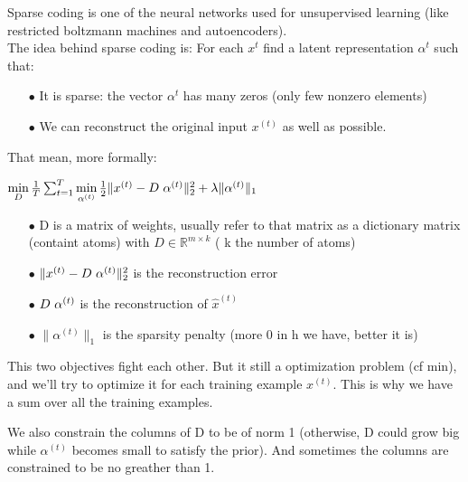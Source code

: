 \documentclass[a4paper,10pt]{article}
\newcommand{\R}{\mathbb{R}}
\begin{document}
Sparse coding is one of the neural networks used for unsupervised learning  (like restricted boltzmann machines and autoencoders).\\
The idea behind sparse coding is: For each $x^{t}$ find a latent representation $\alpha^{t}$ such that:
\begin{itemize}
 \item[$\bullet$] It is sparse: the vector $\alpha^{t}$ has many zeros (only few nonzero elements)
 \item[$\bullet$] We can reconstruct the original input $x^{(t)}$ as well as possible.
\end{itemize}
That mean, more formally:\\

\begin{center}
 $\min\limits_{D} \frac{1}{T} \sum_{t=1}^{T}  \min\limits_{\alpha^{(t)}} \frac{1}{2} \| x^{(t)} - D \hspace{3px} \alpha^{(t)} \|_2^2 + \lambda \|\alpha^{(t)} \|_1$\\
\end{center}

 \begin{itemize}
 \item[$\bullet$] D is a matrix of weights, usually refer to that matrix as a dictionary matrix (containt atoms) with $D \in  \R^{m \times k}$ ( k the number of atoms)
  \item[$\bullet$] $\| x^{(t)} - D \hspace{3px} \alpha^{(t)} \|_2^2 $ is the reconstruction error
  \item[$\bullet$]$ D \hspace{3px} \alpha^{(t)}$ is the reconstruction of $\hat{x}^{(t)}$
  \item[$\bullet$]$\|\alpha^{(t)} \|_1$ is the sparsity penalty (more 0 in h we have, better it is)
 \end{itemize}
This two objectives fight each other. But it still a optimization problem (cf min), and we'll try to optimize it for each training example $x^{(t)}$. This is why we have a sum over all the training examples.
\newline

\indent We also constrain the columns of D to be of norm 1 (otherwise, D could grow big while $\alpha^{(t)}$ becomes small to satisfy the prior). And sometimes the columns are constrained to be no greather than 1.\\
\end{document}
